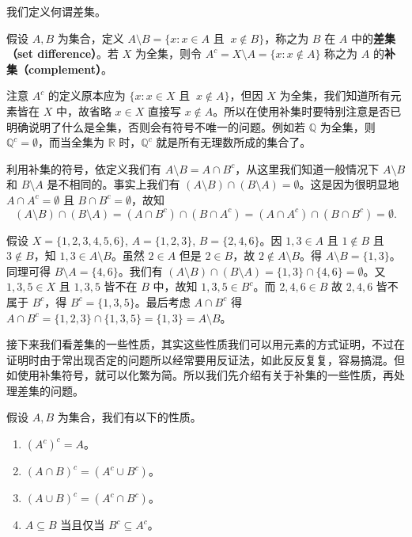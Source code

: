 我们定义何谓差集。

\begin{definition}
假设 $A, B$ 为集合，定义 $A \setminus B = \{x : x \in A \text{ 且 }~ x \notin B\}$，称之为 $B$ 在 $A$ 中的{\bf 差集（set difference）}。若 $X$ 为全集，则令 $A^c = X \setminus A = \{x : x \notin A\}$ 称之为 $A$ 的{\bf 补集（complement）}。
\end{definition}

注意 $A^c$ 的定义原本应为 $\{x : x \in X \text{ 且 }~ x \notin A\}$，但因 $X$ 为全集，我们知道所有元素皆在 $X$ 中，故省略 $x \in X$ 直接写 $x \notin A$。所以在使用补集时要特别注意是否已明确说明了什么是全集，否则会有符号不唯一的问题。例如若 $\mathbb{Q}$ 为全集，则 $\mathbb{Q}^c = \emptyset$，而当全集为 $\mathbb{R}$ 时，$\mathbb{Q}^c$ 就是所有无理数所成的集合了。

利用补集的符号，依定义我们有 $A \setminus B = A \cap B^c$，从这里我们知道一般情况下 $A \setminus B$ 和 $B \setminus A$ 是不相同的。事实上我们有 $(A \setminus B) \cap (B \setminus A) = \emptyset$。这是因为很明显地 $A \cap A^c = \emptyset$ 且 $B \cap B^c = \emptyset$，故知
$$ (A \setminus B) \cap (B \setminus A) = (A \cap B^c) \cap (B \cap A^c) = (A \cap A^c) \cap (B \cap B^c) = \emptyset. $$

\begin{example}
假设 $X = \{1, 2, 3, 4, 5, 6\}$, $A = \{1, 2, 3\}$, $B = \{2, 4, 6\}$。因 $1, 3 \in A$ 且 $1 \notin B$ 且 $3 \notin B$，知 $1, 3 \in A \setminus B$。虽然 $2 \in A$ 但是 $2 \in B$，故 $2 \notin A \setminus B$。得 $A \setminus B = \{1, 3\}$。同理可得 $B \setminus A = \{4, 6\}$。我们有 $(A \setminus B) \cap (B \setminus A) = \{1, 3\} \cap \{4, 6\} = \emptyset$。又 $1, 3, 5 \in X$ 且 $1, 3, 5$ 皆不在 $B$ 中，故知 $1, 3, 5 \in B^c$。而 $2, 4, 6 \in B$ 故 $2, 4, 6$ 皆不属于 $B^c$，得 $B^c = \{1, 3, 5\}$。最后考虑 $A \cap B^c$ 得 $A \cap B^c = \{1, 2, 3\} \cap \{1, 3, 5\} = \{1, 3\} = A \setminus B$。
\end{example}

接下来我们看差集的一些性质，其实这些性质我们可以用元素的方式证明，不过在证明时由于常出现否定的问题所以经常要用反证法，如此反反复复，容易搞混。但如使用补集符号，就可以化繁为简。所以我们先介绍有关于补集的一些性质，再处理差集的问题。

\begin{proposition}
假设 $A, B$ 为集合，我们有以下的性质。
\begin{enumerate}[label={(\arabic*)}]
  \item $(A^c)^c = A$。
  \item $(A \cap B)^c = (A^c \cup B^c)$。
  \item $(A \cup B)^c = (A^c \cap B^c)$。
  \item $A \subseteq B$ 当且仅当 $B^c \subseteq A^c$。
\end{enumerate}
\end{proposition}

